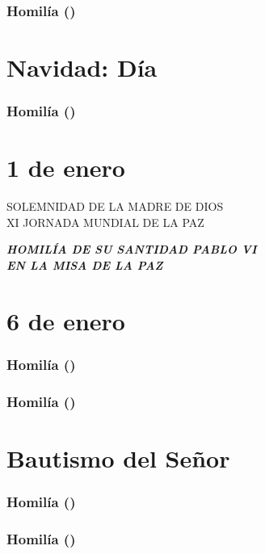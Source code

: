 \subsubsection{Homilía ()}

\section{Navidad: Día} 



\subsubsection{Homilía ()}

\section{1 de enero}  SOLEMNIDAD DE LA MADRE DE DIOS\\ XI JORNADA MUNDIAL DE LA PAZ

\emph{\textbf{HOMILÍA DE SU SANTIDAD PABLO VI\\ EN LA MISA DE LA PAZ}\\[2\baselineskip]}














\section{6 de enero} 



\subsubsection{Homilía ()}

\subsubsection{Homilía ()}

\section{Bautismo del Señor} 



\subsubsection{Homilía ()}

\subsubsection{Homilía ()}
